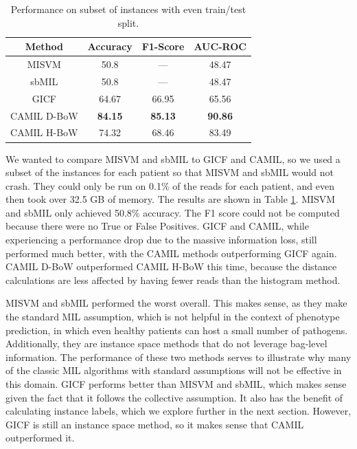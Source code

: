 \begin{table}[h]
\begin{center}
\caption{Performance on subset of instances with even train/test split.}
\label{tab:subset-comp}
\begin{tabular}{|c|ccc|}\hline
Method & Accuracy & F1-Score & AUC-ROC\\\hline
MISVM & 50.8 & --- & 48.47\\\hline
sbMIL & 50.8 & --- & 48.47\\\hline
GICF & 64.67 & 66.95 & 65.56\\\hline
CAMIL D-BoW & \bf{84.15} & \bf{85.13} & \bf{90.86}\\\hline
CAMIL H-BoW & 74.32 & 68.46 & 83.49\\\hline
\end{tabular}
\end{center}
\end{table}

We wanted to compare MISVM and sbMIL to GICF and CAMIL, so we used a subset of the instances for each patient so that MISVM and sbMIL would not crash. They could only be run on 0.1\% of the reads for each patient, and even then took over 32.5 GB of memory. The results are shown in Table \ref{tab:subset-comp}. MISVM and sbMIL only achieved 50.8\% accuracy. The F1 score could not be computed because there were no True or False Positives. GICF and CAMIL, while experiencing a performance drop due to the massive information loss, still performed much better, with the CAMIL methods outperforming GICF again. CAMIL D-BoW outperformed CAMIL H-BoW this time, because the distance calculations are less affected by having fewer reads than the histogram method.

MISVM and sbMIL performed the worst overall. This makes sense, as they make the standard MIL assumption, which is not helpful in the context of phenotype prediction, in which even healthy patients can host a small number of pathogens. Additionally, they are instance space methods that do not leverage bag-level information. The performance of these two methods serves to illustrate why many of the classic MIL algorithms with standard assumptions will not be effective in this domain. GICF performs better than MISVM and sbMIL, which makes sense given the fact that it follows the collective assumption. It also has the benefit of calculating instance labels, which we explore further in the next section. However, GICF is still an instance space method, so it makes sense that CAMIL outperformed it.

